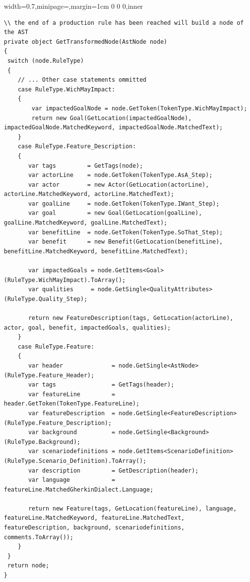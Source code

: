 \documentclass[dissertation,final]{softeng}
\newenvironment{featurecode}[1]
{ \lrbox\featurebox \begin{adjustbox}{width=#1\textwidth,minipage=\textwidth,margin=1cm 0 0 0,inner} }
{ \end{adjustbox}\endlrbox}
\newenvironment{featurelist}[2]
{
\newcommand{\setcaption}{\caption{#1}}
\newcommand{\setlabel}{\label{#2}}
}
{\begin{listing}[h!]\centering\usebox\featurebox\setcaption\setlabel\end{listing}}
\begin{document}
\begin{featurelist}{Parser execution -- Building AST nodes}{lst:gherkin_code_parser_transform_token}
\begin{featurecode}{0.7}
\begin{verbatim}
\\ the end of a production rule has been reached will build a node of the AST
private object GetTransformedNode(AstNode node)
{
 switch (node.RuleType)
 {
    // ... Other case statements ommitted
    case RuleType.WichMayImpact: 
    {
        var impactedGoalNode = node.GetToken(TokenType.WichMayImpact);
        return new Goal(GetLocation(impactedGoalNode), impactedGoalNode.MatchedKeyword, impactedGoalNode.MatchedText);
    }
    case RuleType.Feature_Description:
    {
       var tags         = GetTags(node);
       var actorLine    = node.GetToken(TokenType.AsA_Step);
       var actor        = new Actor(GetLocation(actorLine), actorLine.MatchedKeyword, actorLine.MatchedText);
       var goalLine     = node.GetToken(TokenType.IWant_Step);
       var goal         = new Goal(GetLocation(goalLine), goalLine.MatchedKeyword, goalLine.MatchedText);
       var benefitLine  = node.GetToken(TokenType.SoThat_Step);
       var benefit      = new Benefit(GetLocation(benefitLine), benefitLine.MatchedKeyword, benefitLine.MatchedText);

       var impactedGoals = node.GetItems<Goal>(RuleType.WichMayImpact).ToArray();
       var qualities     = node.GetSingle<QualityAttributes>(RuleType.Quality_Step);
   
       return new FeatureDescription(tags, GetLocation(actorLine), actor, goal, benefit, impactedGoals, qualities);
    }
    case RuleType.Feature:
    {
       var header              = node.GetSingle<AstNode>(RuleType.Feature_Header);
       var tags                = GetTags(header);
       var featureLine         = header.GetToken(TokenType.FeatureLine);
       var featureDescription  = node.GetSingle<FeatureDescription>(RuleType.Feature_Description);                   
       var background          = node.GetSingle<Background>(RuleType.Background);
       var scenariodefinitions = node.GetItems<ScenarioDefinition>(RuleType.Scenario_Definition).ToArray();
       var description         = GetDescription(header);
       var language            = featureLine.MatchedGherkinDialect.Language;

       return new Feature(tags, GetLocation(featureLine), language, featureLine.MatchedKeyword, featureLine.MatchedText, featureDescription, background, scenariodefinitions, comments.ToArray());
    }
 }
 return node;
}
\end{verbatim}
\end{featurecode}
\end{featurelist}
\end{document}
